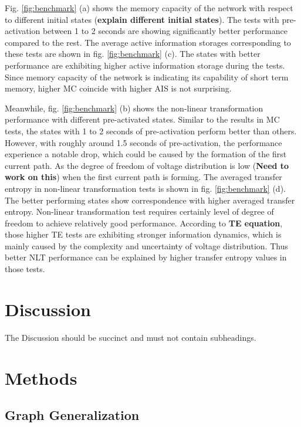 \documentclass[fleqn,10pt,  amsmath,amssymb,aps]{wlscirep}
\begin{document}
Fig. \ref{fig:benchmark} (a) shows the memory capacity of the network with respect to different initial states (\textbf{explain different initial states}). The tests with pre-activation between 1 to 2 seconds are showing significantly better performance compared to the rest. The average active information storages corresponding to these tests are shown in fig. \ref{fig:benchmark} (c). The states with better performance are exhibiting higher active information storage during the tests. Since memory capacity of the network is indicating its capability of short term memory, higher MC coincide with higher AIS is not surprising.

Meanwhile, fig. \ref{fig:benchmark} (b) shows the non-linear transformation performance with different pre-activated states. Similar to the results in MC tests, the states with 1 to 2 seconds of pre-activation perform better than others. However, with roughly around 1.5 seconds of pre-activation, the performance experience a notable drop, which could be caused by the formation of the first current path. As the degree of freedom of voltage distribution is low (\textbf{Need to work on this}) when the first current path is forming. The averaged transfer entropy in non-linear transformation tests is shown in fig. \ref{fig:benchmark} (d). The better performing states show correspondence with higher averaged transfer entropy. Non-linear transformation test requires certainly level of degree of freedom to achieve relatively good performance. According to \textbf{TE equation}, those higher TE tests are exhibiting stronger information dynamics, which is mainly caused by the complexity and uncertainty of voltage distribution. Thus better NLT performance can be explained by higher transfer entropy values in those tests.

\clearpage






\section*{Discussion}

The Discussion should be succinct and must not contain subheadings.

\section*{Methods}

\subsection*{Graph Generalization}
\end{document}
